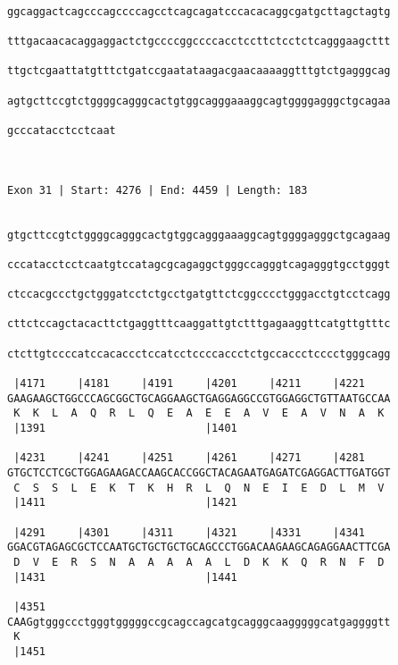 \documentclass{article}
\begin{document}
\begin{Verbatim}
  
ggcaggactcagcccagccccagcctcagcagatcccacacaggcgatgcttagctagtg
                                                            
tttgacaacacaggaggactctgccccggccccacctccttctcctctcagggaagcttt
                                                            
ttgctcgaattatgtttctgatccgaatataagacgaacaaaaggtttgtctgagggcag
                                                            
agtgcttccgtctggggcagggcactgtggcagggaaaggcagtggggagggctgcagaa
                                                            
gcccatacctcctcaat
                 
                 
 
Exon 31 | Start: 4276 | End: 4459 | Length: 183


gtgcttccgtctggggcagggcactgtggcagggaaaggcagtggggagggctgcagaag
                                                            
cccatacctcctcaatgtccatagcgcagaggctgggccagggtcagagggtgcctgggt
                                                            
ctccacgccctgctgggatcctctgcctgatgttctcggcccctgggacctgtcctcagg
                                                            
cttctccagctacacttctgaggtttcaaggattgtctttgagaaggttcatgttgtttc
                                                            
ctcttgtccccatccacaccctccatcctccccaccctctgccaccctcccctgggcagg
                                                            
 |4171     |4181     |4191     |4201     |4211     |4221    
GAAGAAGCTGGCCCAGCGGCTGCAGGAAGCTGAGGAGGCCGTGGAGGCTGTTAATGCCAA
 K  K  L  A  Q  R  L  Q  E  A  E  E  A  V  E  A  V  N  A  K 
 |1391                         |1401                        
  
 |4231     |4241     |4251     |4261     |4271     |4281    
GTGCTCCTCGCTGGAGAAGACCAAGCACCGGCTACAGAATGAGATCGAGGACTTGATGGT
 C  S  S  L  E  K  T  K  H  R  L  Q  N  E  I  E  D  L  M  V 
 |1411                         |1421                        
  
 |4291     |4301     |4311     |4321     |4331     |4341    
GGACGTAGAGCGCTCCAATGCTGCTGCTGCAGCCCTGGACAAGAAGCAGAGGAACTTCGA
 D  V  E  R  S  N  A  A  A  A  A  L  D  K  K  Q  R  N  F  D 
 |1431                         |1441                        
  
 |4351                                                      
CAAGgtgggccctgggtgggggccgcagccagcatgcagggcaagggggcatgaggggtt
 K                                                          
 |1451
  

\end{Verbatim}
\end{document}
